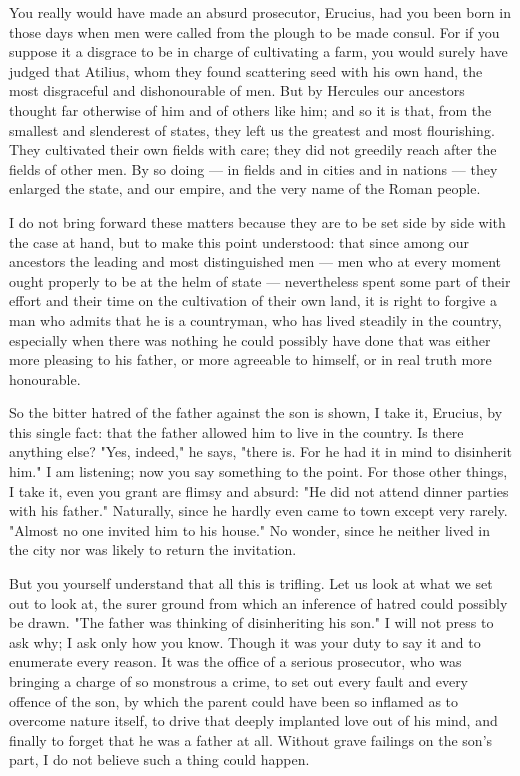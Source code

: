  You really would have made an absurd prosecutor, Erucius, had you been born in those days when men were called from the plough to be made consul. For if you suppose it a disgrace to be in charge of cultivating a farm, you would surely have judged that Atilius, whom they found scattering seed with his own hand, the most disgraceful and dishonourable of men. But by Hercules our ancestors thought far otherwise of him and of others like him; and so it is that, from the smallest and slenderest of states, they left us the greatest and most flourishing. They cultivated their own fields with care; they did not greedily reach after the fields of other men. By so doing --- in fields and in cities and in nations --- they enlarged the state, and our empire, and the very name of the Roman people.

 I do not bring forward these matters because they are to be set side by side with the case at hand, but to make this point understood: that since among our ancestors the leading and most distinguished men --- men who at every moment ought properly to be at the helm of state --- nevertheless spent some part of their effort and their time on the cultivation of their own land, it is right to forgive a man who admits that he is a countryman, who has lived steadily in the country, especially when there was nothing he could possibly have done that was either more pleasing to his father, or more agreeable to himself, or in real truth more honourable.

 So the bitter hatred of the father against the son is shown, I take it, Erucius, by this single fact: that the father allowed him to live in the country. Is there anything else? "Yes, indeed," he says, "there is. For he had it in mind to disinherit him." I am listening; now you say something to the point. For those other things, I take it, even you grant are flimsy and absurd: "He did not attend dinner parties with his father." Naturally, since he hardly even came to town except very rarely. "Almost no one invited him to his house." No wonder, since he neither lived in the city nor was likely to return the invitation.

 But you yourself understand that all this is trifling. Let us look at what we set out to look at, the surer ground from which an inference of hatred could possibly be drawn. "The father was thinking of disinheriting his son." I will not press to ask why; I ask only how you know. Though it was your duty to say it and to enumerate every reason. It was the office of a serious prosecutor, who was bringing a charge of so monstrous a crime, to set out every fault and every offence of the son, by which the parent could have been so inflamed as to overcome nature itself, to drive that deeply implanted love out of his mind, and finally to forget that he was a father at all. Without grave failings on the son's part, I do not believe such a thing could happen.


